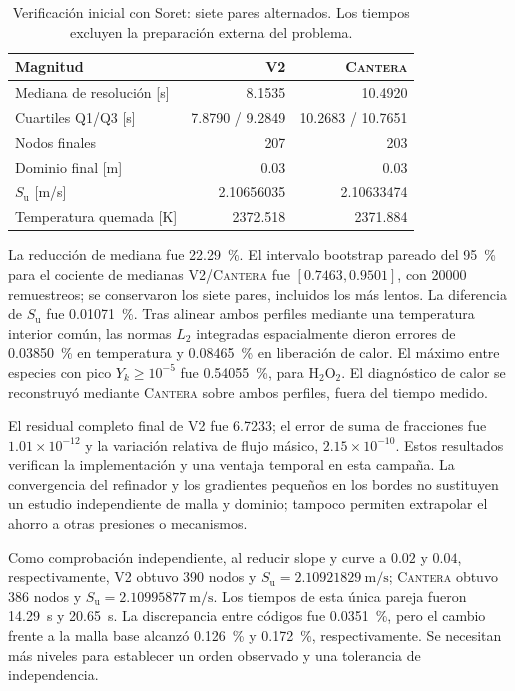 \documentclass[12pt,a4paper,twoside,openany]{book}
\newcommand{\Su}{S_{\mathrm{u}}}
\newcommand{\Vdos}{\textsc{V2}\xspace}
\newcommand{\Cantera}{\textsc{Cantera}\xspace}
\begin{document}
\begin{table}[htbp]
\centering
\caption{Verificación inicial con Soret: siete pares alternados. Los tiempos
excluyen la preparación externa del problema.}
\label{tab:soret-native-initial}
\begin{tabular}{@{}lrr@{}}
\toprule
Magnitud & \Vdos & \Cantera\\
\midrule
Mediana de resolución [s] & 8.1535 & 10.4920\\
Cuartiles Q1/Q3 [s] & 7.8790 / 9.2849 & 10.2683 / 10.7651\\
Nodos finales & 207 & 203\\
Dominio final [m] & 0.03 & 0.03\\
\(\Su\) [m/s] & 2.10656035 & 2.10633474\\
Temperatura quemada [K] & 2372.518 & 2371.884\\
\bottomrule
\end{tabular}
\end{table}

La reducción de mediana fue \SI{22.29}{\percent}. El intervalo bootstrap
pareado del \SI{95}{\percent} para el cociente de medianas \Vdos/\Cantera
fue \([0.7463,0.9501]\), con 20000 remuestreos; se conservaron los siete pares,
incluidos los más lentos. La diferencia de \(\Su\) fue
\SI{0.01071}{\percent}. Tras alinear ambos perfiles mediante una temperatura
interior común, las normas \(L_2\) integradas espacialmente dieron errores de
\SI{0.03850}{\percent} en temperatura y \SI{0.08465}{\percent} en liberación
de calor. El máximo entre especies con pico \(Y_k\ge10^{-5}\) fue
\SI{0.54055}{\percent}, para H\(_2\)O\(_2\). El diagnóstico de calor se
reconstruyó mediante \Cantera sobre ambos perfiles, fuera del tiempo medido.

El residual completo final de \Vdos fue 6.7233; el error de suma de fracciones
fue \(1.01\times10^{-12}\) y la variación relativa de flujo másico,
\(2.15\times10^{-10}\). Estos resultados verifican la implementación y una
ventaja temporal en esta campaña. La convergencia del refinador y los gradientes
pequeños en los bordes no sustituyen un estudio independiente de malla y dominio;
tampoco permiten extrapolar el ahorro a otras presiones o mecanismos.

Como comprobación independiente, al reducir slope y curve a \(0.02\) y
\(0.04\), respectivamente, \Vdos obtuvo 390 nodos y
\(\Su=\SI{2.10921829}{\metre\per\second}\); \Cantera obtuvo 386 nodos y
\(\Su=\SI{2.10995877}{\metre\per\second}\). Los tiempos de esta única pareja
fueron \SI{14.29}{\second} y \SI{20.65}{\second}. La discrepancia entre códigos
fue \SI{0.0351}{\percent}, pero el cambio frente a la malla base alcanzó
\SI{0.126}{\percent} y \SI{0.172}{\percent}, respectivamente. Se necesitan más
niveles para establecer un orden observado y una tolerancia de independencia.
\end{document}
